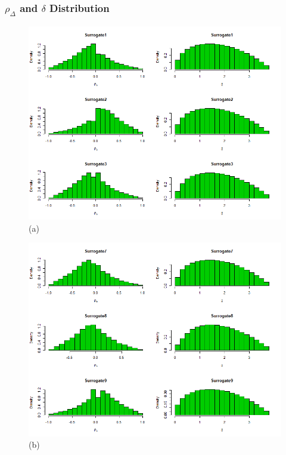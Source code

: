 \documentclass[a4paper,12pt]{article}
\begin{document}
	\subsubsection*{$\rho_{\Delta}$ and $\delta$ Distribution}
	\begin{figure}[H]
		\centering
		\begin{minipage}{0.45\textwidth}
			\includegraphics[scale=0.35]{icaplots1.png}\\(a)
		\end{minipage} 
		\begin{minipage}{0.45\textwidth}
			\includegraphics[scale=0.35]{icaplots3.png}\\(b)
		\end{minipage} 
	\end{figure}
	
\end{document}
